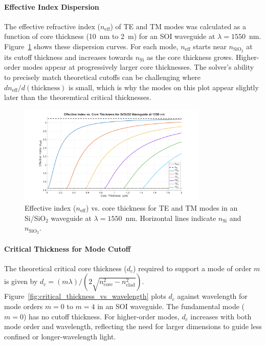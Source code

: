 \documentclass[10pt, a4paper]{article}
\begin{document}
\paragraph{Effective Index Dispersion}
The effective refractive index ($n_{\text{eff}}$) of TE and TM modes was calculated as a function of core thickness (10~nm to 2~{\textmu}m) for an SOI waveguide at $\lambda = 1550$~nm. Figure~\ref{fig:neff_vs_thickness_Si_SiO2_1550nm} shows these dispersion curves. For each mode, $n_{\text{eff}}$ starts near $n_{\text{SiO}_2}$ at its cutoff thickness and increases towards $n_{\text{Si}}$ as the core thickness grows. Higher-order modes appear at progressively larger core thicknesses. The solver's ability to precisely match theoretical cutoffs can be challenging where $dn_{\text{eff}}/d(\text{thickness})$ is small, which is why the modes on this plot appear slightly later than the theoremtical critical thicknesses.

\begin{figure}[h!]
    \centering
    \includegraphics[width=0.8\textwidth]{task1/neff_vs_thickness_Si_SiO2_1550nm.png}
    \caption{Effective index ($n_{\text{eff}}$) vs. core thickness for TE and TM modes in an Si/SiO$_2$ waveguide at $\lambda = 1550$~nm. Horizontal lines indicate $n_{\text{Si}}$ and $n_{\text{SiO}_2}$.}
    \label{fig:neff_vs_thickness_Si_SiO2_1550nm}
\end{figure}

\paragraph{Critical Thickness for Mode Cutoff}
The theoretical critical core thickness ($d_c$) required to support a mode of order $m$ is given by $d_c = (m \lambda) / (2 \sqrt{n_{\text{core}}^2 - n_{\text{clad}}^2})$. Figure~\ref{fig:critical_thickness_vs_wavelength} plots $d_c$ against wavelength for mode orders $m=0$ to $m=4$ in an SOI waveguide. The fundamental mode ($m=0$) has no cutoff thickness. For higher-order modes, $d_c$ increases with both mode order and wavelength, reflecting the need for larger dimensions to guide less confined or longer-wavelength light.
\end{document}
